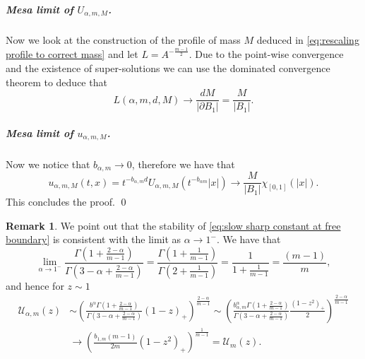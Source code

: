 \documentclass[a4paper]{article}
\theoremstyle{definition}
\newtheorem{remark}[theorem]{Remark}
\begin{document}
\subparagraph{Mesa limit of $U_{\alpha,m,M}$.} Now we look at the construction of the profile of mass $M$ deduced in \eqref{eq:rescaling profile to correct mass} and let $L = A^{-\frac{m-1}{2}}$.
Due to the point-wise convergence and the existence of super-solutions we can use the dominated convergence theorem to deduce that
\begin{equation*}
L(\alpha,m,d,M) \to \frac{dM}{|\partial B_1|} = \frac{M}{|B_1|}.
\end{equation*}

\subparagraph{Mesa limit of $u_{\alpha,m,M}$.} Now we notice that $b_{\alpha,m} \to 0$, therefore we have that
\begin{equation*}
u_{\alpha,m,M}(t,x) = t^{-b_{\alpha,m} d} U_{\alpha,m,M}(t^{-b_{\alpha m}}|x|) \to \frac{M}{|B_1|} \chi_{[0,1]}(|x|).
\end{equation*}
This concludes the proof. \qed

\begin{remark}
We point out that the stability of \eqref{eq:slow sharp constant at free boundary} is consistent with the limit as $\alpha \to 1^-$.
%
%
%
%
%
We have that
\begin{equation*}
  \lim_{\alpha \to 1^-} \frac{\Gamma(1 + \tfrac{2-\alpha}{m-1} )}{\Gamma(3-\alpha+\tfrac{2-\alpha}{m-1})} = \frac{\Gamma(1 + \frac{1}{m-1})}{\Gamma(2 + \frac{1}{m-1})} = \frac{1}{1 + \frac{1}{m-1}} = \frac{(m-1)}{m},
\end{equation*}
and hence for $z \sim 1$
\begin{align*}
  \mathcal U_{\alpha,m}(z) &\sim \left( \frac{b^\alpha \Gamma(1 + \tfrac{2-\alpha}{m-1} )}{\Gamma(3-\alpha+\tfrac{2-\alpha}{m-1})} (1-z)_+ \right)^{\frac{2-\alpha}{m-1}}
  \sim
  \left( \frac{b_{\alpha,m}^\alpha \Gamma(1 + \tfrac{2-\alpha}{m-1} )}{\Gamma(3-\alpha+\tfrac{2-\alpha}{m-1})} \frac{(1-z^2)_+}{2} \right)^{\frac{2-\alpha}{m-1}}
  \\
  &\to
  \left( \frac{b_{1,m}(m-1)}{2m} (1-z^2)_+ \right)^{\frac{1}{m-1}} = \mathcal U_m(z).
\end{align*}
\end{remark}

%
%
%
%
%

%
%

%
%
%
%
%
%

%
%
%
%
%
%
%
%
%
%
%

%
%
%
%
%
%
%
%
%
%
%
%
%

%
%
%

%

%
%
%
%
%
\end{document}

